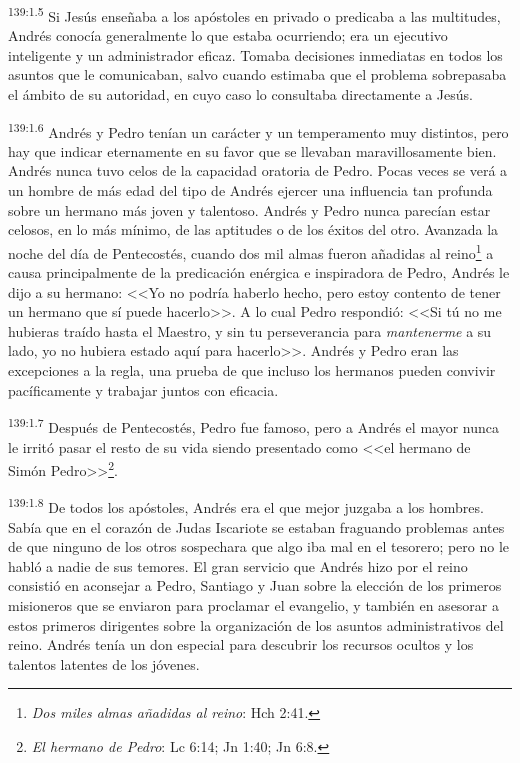 \par 
\textsuperscript{139:1.5} Si Jesús enseñaba a los apóstoles en privado o predicaba a las multitudes, Andrés conocía generalmente lo que estaba ocurriendo; era un ejecutivo inteligente y un administrador eficaz. Tomaba decisiones inmediatas en todos los asuntos que le comunicaban, salvo cuando estimaba que el problema sobrepasaba el ámbito de su autoridad, en cuyo caso lo consultaba directamente a Jesús.

\par 
\textsuperscript{139:1.6} Andrés y Pedro tenían un carácter y un temperamento muy distintos, pero hay que indicar eternamente en su favor que se llevaban maravillosamente bien. Andrés nunca tuvo celos de la capacidad oratoria de Pedro. Pocas veces se verá a un hombre de más edad del tipo de Andrés ejercer una influencia tan profunda sobre un hermano más joven y talentoso. Andrés y Pedro nunca parecían estar celosos, en lo más mínimo, de las aptitudes o de los éxitos del otro. Avanzada la noche del día de Pentecostés, cuando dos mil almas fueron añadidas al reino\footnote{\textit{Dos miles almas añadidas al reino}: Hch 2:41.} a causa principalmente de la predicación enérgica e inspiradora de Pedro, Andrés le dijo a su hermano: <<Yo no podría haberlo hecho, pero estoy contento de tener un hermano que sí puede hacerlo>>. A lo cual Pedro respondió: <<Si tú no me hubieras traído hasta el Maestro, y sin tu perseverancia para \textit{mantenerme} a su lado, yo no hubiera estado aquí para hacerlo>>. Andrés y Pedro eran las excepciones a la regla, una prueba de que incluso los hermanos pueden convivir pacíficamente y trabajar juntos con eficacia.

\par 
\textsuperscript{139:1.7} Después de Pentecostés, Pedro fue famoso, pero a Andrés el mayor nunca le irritó pasar el resto de su vida siendo presentado como <<el hermano de Simón Pedro>>\footnote{\textit{El hermano de Pedro}: Lc 6:14; Jn 1:40; Jn 6:8.}.

\par 
\textsuperscript{139:1.8} De todos los apóstoles, Andrés era el que mejor juzgaba a los hombres. Sabía que en el corazón de Judas Iscariote se estaban fraguando problemas antes de que ninguno de los otros sospechara que algo iba mal en el tesorero; pero no le habló a nadie de sus temores. El gran servicio que Andrés hizo por el reino consistió en aconsejar a Pedro, Santiago y Juan sobre la elección de los primeros misioneros que se enviaron para proclamar el evangelio, y también en asesorar a estos primeros dirigentes sobre la organización de los asuntos administrativos del reino. Andrés tenía un don especial para descubrir los recursos ocultos y los talentos latentes de los jóvenes.

